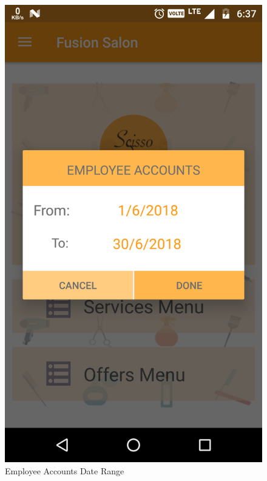 \\
\begin{figure}[h]
	\centering
	\includegraphics[width=0.7\linewidth]{EmployeeAccountsDateRange}
	\caption{Employee Accounts Date Range}
\end{figure}
\pagebreak

